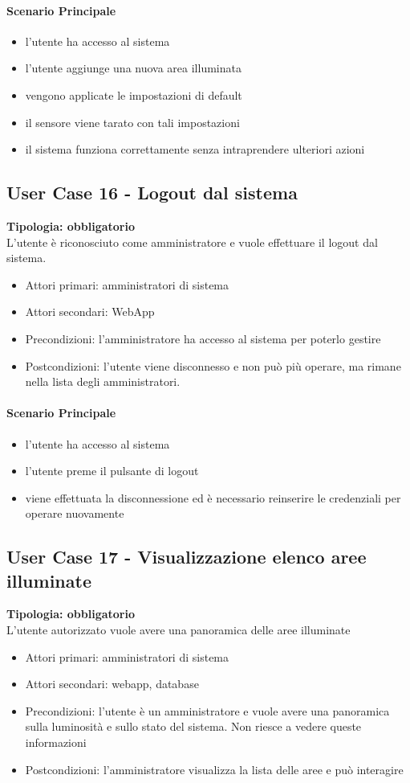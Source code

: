 \documentclass[12pt]{article}
\begin{document}
\paragraph{Scenario Principale}
\begin{itemize}
	\item l'utente ha accesso al sistema
	\item l'utente aggiunge una nuova area illuminata
	\item vengono applicate le impostazioni di default
	\item il sensore viene tarato con tali impostazioni
	\item il sistema funziona correttamente senza intraprendere ulteriori azioni
\end{itemize}

\subsection{User Case 16 - Logout dal sistema}
\textbf{Tipologia: obbligatorio} \\
L'utente è riconosciuto come amministratore e vuole effettuare il logout dal sistema.
\begin{itemize}
	\item Attori primari: amministratori di sistema
	\item Attori secondari: WebApp
	\item Precondizioni: l'amministratore ha accesso al sistema per poterlo gestire
	\item Postcondizioni: l'utente viene disconnesso e non può più operare, ma rimane nella lista degli amministratori.
\end{itemize}
\paragraph{Scenario Principale}
\begin{itemize}
	\item l'utente ha accesso al sistema
	\item l'utente preme il pulsante di logout
	\item viene effettuata la disconnessione ed è necessario reinserire le credenziali per operare nuovamente
\end{itemize}

\subsection{User Case 17 - Visualizzazione elenco aree illuminate}
\textbf{Tipologia: obbligatorio} \\
L'utente autorizzato vuole avere una panoramica delle aree illuminate
\begin{itemize}
	\item Attori primari: amministratori di sistema
	\item Attori secondari: webapp, database
	\item Precondizioni: l'utente è un amministratore e vuole avere una panoramica sulla luminosità e sullo stato del sistema. Non riesce a vedere queste informazioni
	\item Postcondizioni: l'amministratore visualizza la lista delle aree e può interagire
\end{itemize}
\end{document}
